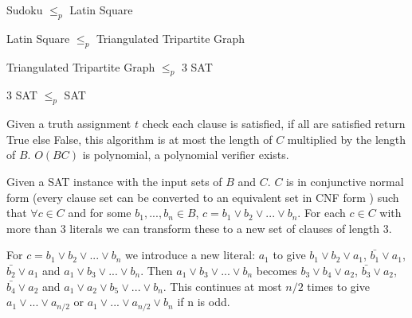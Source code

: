 \documentclass[final]{beamer}
\newlength{\colwidth}
\newcounter{row}
\newcounter{col}
\newcounter{rowa}
\newcounter{cola}
\newcommand\setrowa[3]{
  \setcounter{cola}{1}
  \foreach \n in {#1, #2, #3} {
    \edef\x{\value{cola} - 0.5}
    \edef\y{3.5 - \value{rowa}}
    \node[anchor=center] at (\x, \y) {\n};
    \stepcounter{cola}
  }
  \stepcounter{rowa}
}
\begin{document}
\begin{frame}[t]
\begin{columns}[t]
\begin{column}{\colwidth}
\begin{block}{Sudoku $\leq_p$ Latin Square}

  \end{block}
  \begin{block}{Latin Square $\leq_p$ Triangulated Tripartite Graph}

  \end{block}
  \begin{block}{Triangulated Tripartite Graph $\leq_p$ 3 SAT}

  \end{block}
  \begin{block}{3 SAT $\leq_p$  SAT}

Given a truth assignment $t$ check each clause is satisfied, if all are satisfied return True else False, this algorithm is at most the length of $C$ multiplied by the length of $B$. $O(BC)$ is polynomial, a polynomial verifier exists. 

Given a SAT instance with the input sets of $B$ and $C$. $C$ is in conjunctive normal form (every clause set can be converted to an equivalent set in CNF form \cite{CNF}) such that $\forall c \in C$ and for some $b_1, ... ,b_n \in B$, $c = b_1 \lor b_2 \lor ... \lor b_n$. For each $c \in C$ with more than 3 literals we can transform these to a new set of clauses of length 3. 

For $c = b_1 \lor b_2 \lor ... \lor b_n$ we introduce a new literal: $a_1$ to give $b_1 \lor b_2 \lor a_1$, $\bar{b_1} \lor a_1$, $\bar{b_2} \lor a_1$ and $a_1 \lor b_3 \lor ... \lor b_n$. Then $a_1 \lor b_3 \lor ... \lor b_n$ becomes $b_3 \lor b_4 \lor a_2$, $\bar{b_3} \lor a_2$, $\bar{b_4} \lor a_2$ and $a_1 \lor a_2 \lor b_5 \lor ... \lor b_n$. This continues at most $n/2$ times to give $a_1 \lor ... \lor a_{n/2}$ or $a_1 \lor ... \lor a_{n/2} \lor b_n$ if n is odd. 


\end{block}
\end{column}
\end{columns}
\end{frame}
\end{document}
